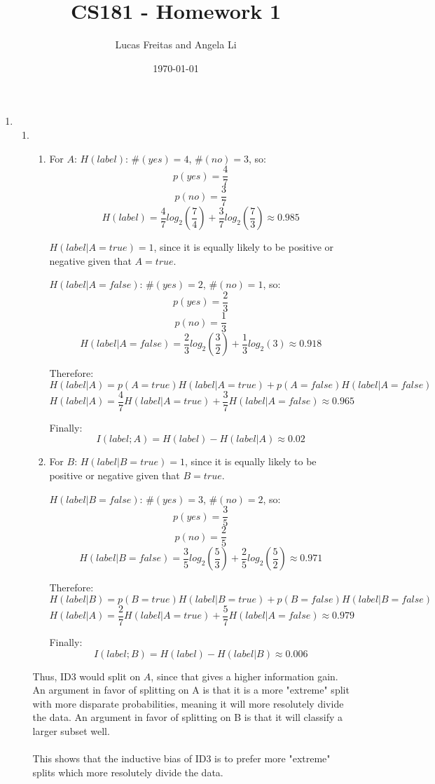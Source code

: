 \documentclass[11pt]{article}
\title{CS181 - Homework 1}
\author{Lucas Freitas and Angela Li}
\date{\today}
\begin{document}
\maketitle
\begin {enumerate}
\item
\begin {enumerate}
\item
\begin{enumerate}
\item
For $A$:
\newline
\newline
$H(label)$: $\#(yes)=4$, $\#(no)=3$, so:
$$p(yes)=\frac{4}{7}$$
$$p(no)=\frac{3}{7}$$
$$H(label)=\frac{4}{7}log_2(\frac{7}{4})+\frac{3}{7}log_2(\frac{7}{3})\approx0.985$$

$H(label|A=true)=1$, since it is equally likely to be positive or negative given that $A=true$.
\newline

$H(label|A=false)$: $\#(yes)=2$, $\#(no)=1$, so:
$$p(yes)=\frac{2}{3}$$
$$p(no)=\frac{1}{3}$$
$$H(label|A=false)=\frac{2}{3}log_2(\frac{3}{2})+\frac{1}{3}log_2(3)\approx0.918$$

Therefore:
$$H(label|A)=p(A=true)H(label|A=true)+p(A=false)H(label|A=false)$$
$$H(label|A)=\frac{4}{7}H(label|A=true)+\frac{3}{7}H(label|A=false)\approx 0.965$$

Finally:
$$I(label; A)=H(label)-H(label|A)\approx0.02$$

\item
For $B$:
\newline
\newline
$H(label|B=true)=1$, since it is equally likely to be positive or negative given that $B=true$.
\newline

$H(label|B=false)$: $\#(yes)=3$, $\#(no)=2$, so:
$$p(yes)=\frac{3}{5}$$
$$p(no)=\frac{2}{5}$$
$$H(label|B=false)=\frac{3}{5}log_2(\frac{5}{3})+\frac{2}{5}log_2(\frac{5}{2})\approx0.971$$

Therefore:
$$H(label|B)=p(B=true)H(label|B=true)+p(B=false)H(label|B=false)$$
$$H(label|A)=\frac{2}{7}H(label|A=true)+\frac{5}{7}H(label|A=false)\approx 0.979$$

Finally:
$$I(label; B)=H(label)-H(label|B)\approx0.006$$

\end{enumerate}
Thus, ID3 would split on $A$, since that gives a higher information gain. An argument in favor of splitting on A is that it is a more "extreme" split with more disparate probabilities, meaning it will more resolutely divide the data. An argument in favor of splitting on B is that it will classify a larger subset well.
\\ \\
This shows that the inductive bias of ID3 is to prefer more "extreme" splits which more resolutely divide the data. 


\end{enumerate}
\end{enumerate}
\end{document}
